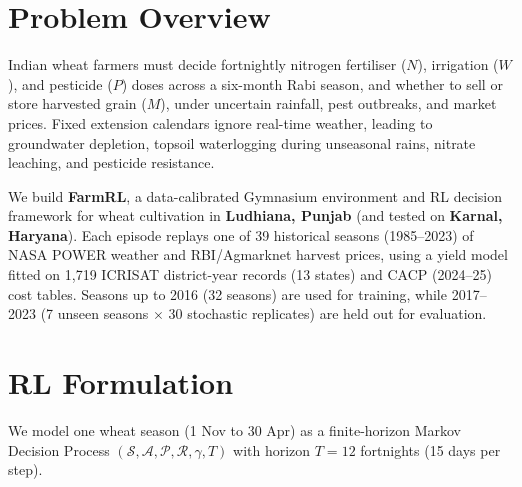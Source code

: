 \documentclass[10pt,twocolumn]{article}
\begin{document}
\fontsize{9.4pt}{11.4pt}\selectfont


\section{Problem Overview}
Indian wheat farmers must decide fortnightly nitrogen fertiliser ($N$), irrigation ($W$), and pesticide ($P$) doses across a six-month Rabi season, and whether to sell or store harvested grain ($M$), under uncertain rainfall, pest outbreaks, and market prices. Fixed extension calendars ignore real-time weather, leading to groundwater depletion, topsoil waterlogging during unseasonal rains, nitrate leaching, and pesticide resistance.

We build \textbf{FarmRL}, a data-calibrated Gymnasium environment and RL decision framework for wheat cultivation in \textbf{Ludhiana, Punjab} (and tested on \textbf{Karnal, Haryana}). Each episode replays one of 39 historical seasons (1985--2023) of NASA POWER weather and RBI/Agmarknet harvest prices, using a yield model fitted on 1,719 ICRISAT district-year records (13 states) and CACP (2024--25) cost tables. Seasons up to 2016 (32 seasons) are used for training, while 2017--2023 (7 unseen seasons $\times$ 30 stochastic replicates) are held out for evaluation.

\section{RL Formulation}
We model one wheat season (1 Nov to 30 Apr) as a finite-horizon Markov Decision Process $(\mathcal{S}, \mathcal{A}, \mathcal{P}, \mathcal{R}, \gamma, T)$ with horizon $T = 12$ fortnights (15 days per step).
\end{document}
